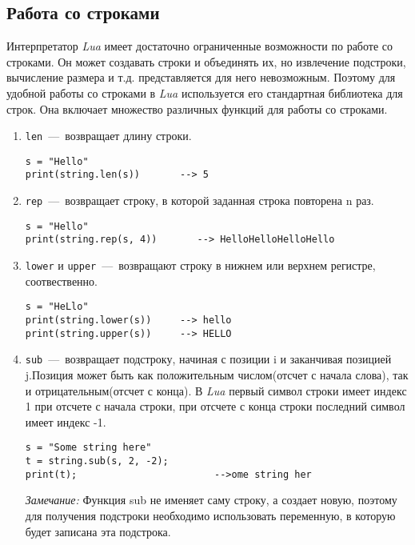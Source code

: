 \subsection{Работа со строками}

Интерпретатор \emph{Lua} имеет достаточно ограниченные возможности по работе со строками. Он может создавать строки и объединять их, но извлечение подстроки, вычисление размера и т.д. представляется для него невозможным. Поэтому для удобной работы со строками в \emph{Lua} используется его стандартная библиотека для строк. Она включает множество различных функций для работы со строками. 

\begin{enumerate}
	\item \lstinline{len}~---~возвращает длину строки.

\begin{lstlisting}
s = "Hello"
print(string.len(s))       --> 5
\end{lstlisting} 

	\item \lstinline{rep}~---~возвращает строку, в которой заданная строка повторена n раз.
	
\begin{lstlisting}
s = "Hello"
print(string.rep(s, 4))       --> HelloHelloHelloHello
\end{lstlisting} 

	\item \lstinline{lower} и \lstinline{upper}~---~возвращают строку в нижнем или верхнем регистре, соотвественно. 

\begin{lstlisting}
s = "HeLlo"
print(string.lower(s))     --> hello
print(string.upper(s))     --> HELLO
\end{lstlisting} 

	\item \lstinline{sub}~---~возвращает подстроку, начиная с позиции i и заканчивая позицией j.Позиция может быть как положительным числом(отсчет с начала слова),  так и отрицательным(отсчет с конца). В \emph{Lua} первый символ строки имеет индекс 1 при отсчете с начала строки, при отсчете с конца строки последний символ имеет индекс -1. 
	
\begin{lstlisting}
s = "Some string here"
t = string.sub(s, 2, -2);
print(t);                        -->ome string her
\end{lstlisting} 

\emph{Замечание:}
Функция sub не именяет саму строку, а создает новую, поэтому для получения подстроки необходимо использовать переменную, в которую будет записана эта подстрока. 


\end{enumerate}
